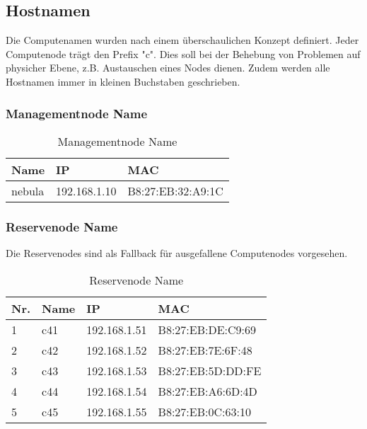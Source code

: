 \subsection{Hostnamen}
Die Computenamen wurden nach einem überschaulichen Konzept definiert. Jeder Computenode trägt den Prefix "c". Dies soll bei der Behebung von Problemen auf physicher Ebene, z.B. Austauschen eines Nodes dienen. Zudem werden alle Hostnamen immer in kleinen Buchstaben geschrieben.

\subsubsection{Managementnode Name}
\begin{table}[H]
\centering
\begin{tabular}{p{5cm}p{5.5cm}p{5.5cm}}
\hline
\rowcolor{heading} \textbf{Name} & \textbf{IP} & \textbf{MAC} \\\hline
nebula & 192.168.1.10 & B8:27:EB:32:A9:1C \\\hline
\end{tabular}
\caption{Managementnode Name}
\end{table}

\subsubsection{Reservenode Name}
Die Reservenodes sind als Fallback für ausgefallene Computenodes vorgesehen.
\begin{table}[H]
\centering
\begin{tabular}{p{1cm}p{2cm}p{6cm}p{6cm}}
\hline
\rowcolor{heading} \textbf{Nr.} & \textbf{Name} & \textbf{IP} & \textbf{MAC} \\\hline
1 & c41 & 192.168.1.51 & B8:27:EB:DE:C9:69 \\\hline
2 & c42 & 192.168.1.52 & B8:27:EB:7E:6F:48 \\\hline
3 & c43 & 192.168.1.53 & B8:27:EB:5D:DD:FE \\\hline
4 & c44 & 192.168.1.54 & B8:27:EB:A6:6D:4D \\\hline
5 & c45 & 192.168.1.55 & B8:27:EB:0C:63:10 \\\hline
\end{tabular}
\caption{Reservenode Name}
\end{table}

